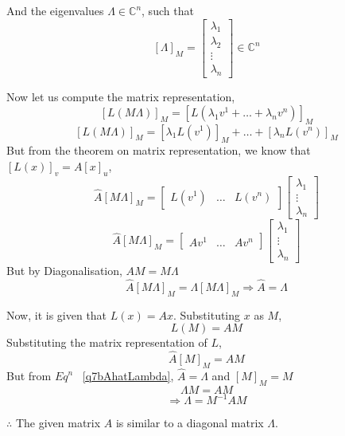 \documentclass[a4paper]{article}
\begin{document}
\begin{qalist}
			And the eigenvalues $\Lambda \in {\mathbb{C}}^{n}$, such that
			\begin{equation}
				{[\Lambda]}_{M} = \begin{bmatrix} {\lambda}_{1} \\ {\lambda}_{2} \\ \vdots \\ {\lambda}_{n}\end{bmatrix} \in {\mathbb{C}}^{n}
			\end{equation}
			
			Now let us compute the matrix representation, 
			\begin{equation}
			{[L(M\Lambda)]}_{M} = {[L( {\lambda}_{1}{v}^{1} + \ldots + {\lambda}_{n}{v}^{n})]}_{M}
			\end{equation}
			\begin{equation}
				{[L(M\Lambda)]}_{M} = {[{\lambda}_{1}L({v}^{1})]}_{M} + \ldots + {[{\lambda}_{n}L({v}^{n})]}_{M}
			\end{equation}
			But from the theorem on matrix representation, we know that ${[L(x)]}_{v} = A{[x]}_{u}$,
			\begin{equation}
				\hat{A}{[M\Lambda]}_{M} = \begin{bmatrix}L({v}^{1}) & \ldots & L({v}^{n})\end{bmatrix} \begin{bmatrix}{\lambda}_{1} \\ \vdots \\ {\lambda}_{n}\end{bmatrix}
			\end{equation}
			\begin{equation}
				\hat{A}{[M\Lambda]}_{M} = \begin{bmatrix}A{v}^{1} & \ldots & A{v}^{n}\end{bmatrix} \begin{bmatrix}{\lambda}_{1} \\ \vdots \\ {\lambda}_{n}\end{bmatrix}
			\end{equation}		
			But by Diagonalisation, $AM = M\Lambda$
			\begin{equation}\label{q7bAhatLambda}
				\hat{A}{[M\Lambda]}_{M} = \Lambda {[M \Lambda]}_{M} \Rightarrow \hat{A} = \Lambda
			\end{equation}
			
			Now, it is given that $L(x) = Ax$. Substituting $x$ as $M$, 
			\begin{equation} L(M) = AM \end{equation}
			Substituting the matrix representation of $L$, 
			\begin{equation} \hat{A}{[M]}_{M} = AM \end{equation}
			But from ${Eq}^{n}$ ~\ref{q7bAhatLambda}, $\hat{A} = \Lambda$ and ${[M]}_{M} = M$
			\begin{equation} \Lambda M = AM\end{equation}
			\begin{equation} \Rightarrow \Lambda  = {M}^{-1}AM\end{equation}
			
			$\therefore$ The given matrix $A$ is similar to a diagonal matrix $\Lambda$.
			
	\end{qalist}
\end{document}
